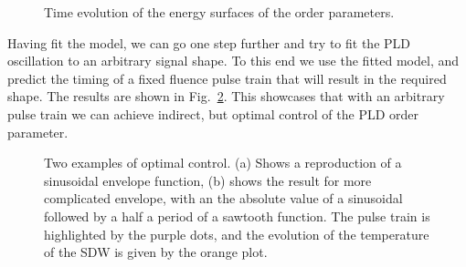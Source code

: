 \begin{figure}
	\begin{subfigure}{0.5\textwidth}
	\end{subfigure}
	\begin{subfigure}{0.5\textwidth}
	\end{subfigure}
	\caption{\label{fig:Cr_energy_surfaces} Time evolution of the energy surfaces of the order parameters.}
\end{figure}

Having fit the model, we can go one step further and try to fit the PLD oscillation to an arbitrary signal shape. To this end we use the fitted model, and predict the timing of a fixed fluence pulse train that will result in the required shape. The results are shown in Fig.~\ref{fig:Cr_control}. This showcases that with an arbitrary pulse train we can achieve indirect, but optimal control of the PLD order parameter.
\begin{figure}
	\caption{\label{fig:Cr_control} Two examples of optimal control. (a) Shows a reproduction of a sinusoidal envelope function, (b) shows the result for more complicated envelope, with an the absolute value of a sinusoidal followed by a half a period of a sawtooth function. The pulse train is highlighted by the purple dots, and the evolution of the temperature of the SDW is given by the orange plot.}
\end{figure}




